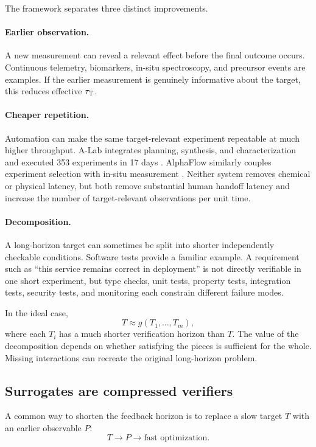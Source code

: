 The framework separates three distinct improvements.

\paragraph{Earlier observation.}
A new measurement can reveal a relevant effect before the final outcome occurs.
Continuous telemetry, biomarkers, in-situ spectroscopy, and precursor events are
examples.  If the earlier measurement is genuinely informative about the target, this
reduces effective \(\tau_{\mathrm{T}}\).

\paragraph{Cheaper repetition.}
Automation can make the same target-relevant experiment repeatable at much higher
throughput.  A-Lab integrates planning, synthesis, and characterization and executed
353 experiments in 17 days \parencite{szymanski2023alab}.  AlphaFlow similarly couples
experiment selection with in-situ measurement
\parencite{volk2023alphaflow}.  Neither system removes chemical or physical latency, but
both remove substantial human handoff latency and increase the number of
target-relevant observations per unit time.

\paragraph{Decomposition.}
A long-horizon target can sometimes be split into shorter independently checkable
conditions.  Software tests provide a familiar example.  A requirement such as
``this service remains correct in deployment'' is not directly verifiable in one short
experiment, but type checks, unit tests, property tests, integration tests, security
tests, and monitoring each constrain different failure modes.

In the ideal case,
\[
    T \approx g(T_1,\ldots,T_m),
\]
where each \(T_i\) has a much shorter verification horizon than \(T\).  The value of
the decomposition depends on whether satisfying the pieces is sufficient for the
whole.  Missing interactions can recreate the original long-horizon problem.

\subsection{Surrogates are compressed verifiers}

A common way to shorten the feedback horizon is to replace a slow target \(T\) with an
earlier observable \(P\):
\[
    T
    \longrightarrow
    P
    \longrightarrow
    \text{fast optimization}.
\]

